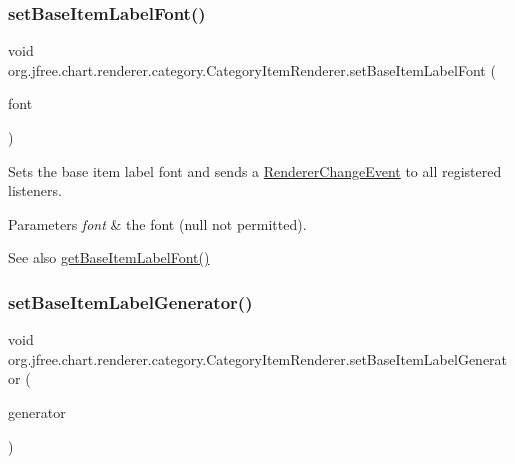 \subsubsection{\texorpdfstring{set\+Base\+Item\+Label\+Font()}{setBaseItemLabelFont()}}
{\footnotesize\ttfamily void org.\+jfree.\+chart.\+renderer.\+category.\+Category\+Item\+Renderer.\+set\+Base\+Item\+Label\+Font (\begin{DoxyParamCaption}\item[{Font}]{font }\end{DoxyParamCaption})}

Sets the base item label font and sends a \mbox{\hyperlink{}{Renderer\+Change\+Event}} to all registered listeners.


\begin{DoxyParams}{Parameters}
{\em font} & the font ({\ttfamily null} not permitted).\\
\hline
\end{DoxyParams}
\begin{DoxySeeAlso}{See also}
\mbox{\hyperlink{interfaceorg_1_1jfree_1_1chart_1_1renderer_1_1category_1_1_category_item_renderer_a4383cfd603df36a6ca4b5f02c5ca6f48}{get\+Base\+Item\+Label\+Font()}} 
\end{DoxySeeAlso}
\mbox{\label{interfaceorg_1_1jfree_1_1chart_1_1renderer_1_1category_1_1_category_item_renderer_aa4ca7bd2b2d702c879718fece021d3a4}} 
\subsubsection{\texorpdfstring{set\+Base\+Item\+Label\+Generator()}{setBaseItemLabelGenerator()}}
{\footnotesize\ttfamily void org.\+jfree.\+chart.\+renderer.\+category.\+Category\+Item\+Renderer.\+set\+Base\+Item\+Label\+Generator (\begin{DoxyParamCaption}\item[{\mbox{\hyperlink{interfaceorg_1_1jfree_1_1chart_1_1labels_1_1_category_item_label_generator}{Category\+Item\+Label\+Generator}}}]{generator }\end{DoxyParamCaption})}

